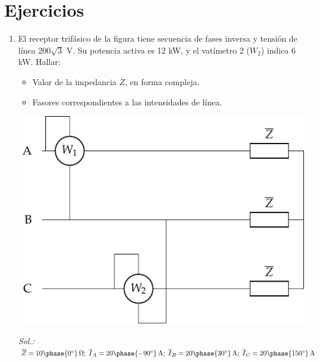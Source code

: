 \section*{Ejercicios}
\begin{enumerate}

\item El receptor trifásico de la figura tiene secuencia de fases
  inversa y tensión de línea 200$\sqrt{3}$ V. Su potencia activa es 12
  kW, y el vatímetro 2 ($W_2$) indica 6 kW. Hallar:
  \begin{itemize}
  \item Valor de la impedancia $\overline{Z}$, en forma compleja.
  \item Fasores correspondientes a las intensidades de línea.
  \end{itemize}

\begin{center}
  \includegraphics[width=0.5\linewidth]{../figs/ej6_BT3.pdf}
\end{center}

\emph{Sol.:\;
  $\overline{Z}=10\phase{0^\circ}\,\Omega;\;
  \overline{I}_A={20\phase{-90^\circ}\,\mathrm{A}};\;
  \overline{I}_B={20\phase{30^\circ}\,\mathrm{A}};\;
  \overline{I}_C={20\phase{150^\circ}\,\mathrm{A}}$}



\end{enumerate}
